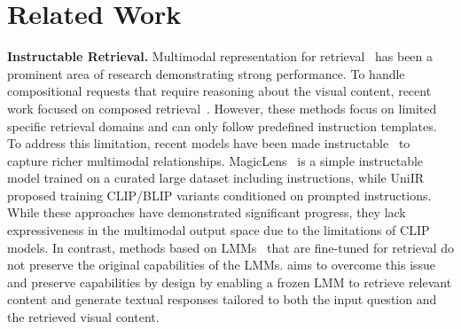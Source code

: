 \section{Related Work}
\label{sec:related_work}

\noindent\textbf{Instructable Retrieval.}
%
Multimodal representation for retrieval~\cite{radford2021clip, li2022blip, zhai2023sigmoid, chen2023pali, yu2022coca, wang2023image, zhou2022non, zhai2019large, yao2021filip, gao2022pyramidclip, lee2022uniclip, ilharco2021openclip, schuhmann2021laion400m, bao2022vlmo} has been a prominent area of research demonstrating strong performance. %
%
To handle compositional requests that require reasoning about the visual content, recent work focused on composed retrieval~\cite{vo2019composing, Baldrati_2022_CVPR, Baldrati_2023_ICCV, Goenka_2022_CVPR, Chen_2020_CVPR, Wu_2021_CVPR, Gu_2024_CVPR, Vaze_2023_CVPR, Suo_2024_CVPR, Wan_2024_CVPR, Liu_2024_WACV, karthik2023vision}.
However, these methods focus on limited specific retrieval domains and can only follow predefined instruction templates.
%
To address this limitation, recent models have been made instructable~\cite{zhang2024magiclens, wei2023uniir, jiang2024vlm2vec, lin2024mmembeduniversalmultimodalretrieval, qi2024roravlm, karthik2023vision, levy2024chatting} to capture richer multimodal relationships. 
MagicLens~\cite{zhang2024magiclens} is a simple instructable model trained on a curated large dataset including instructions, while UniIR~\cite{wei2023uniir} proposed training CLIP/BLIP variants conditioned on prompted instructions.
%
While these approaches have demonstrated significant progress, they lack expressiveness in the multimodal output space due to the limitations of CLIP models. 
In contrast, methods based on LMMs~\cite{lin2024mmembeduniversalmultimodalretrieval, jiang2024vlm2vec} that are fine-tuned for retrieval do not preserve the original capabilities of the LMMs.
%
%
\modelname aims to overcome this issue and preserve capabilities by design by enabling a frozen LMM to retrieve relevant content and generate textual responses tailored to both the input question and the retrieved visual content.
%
%


